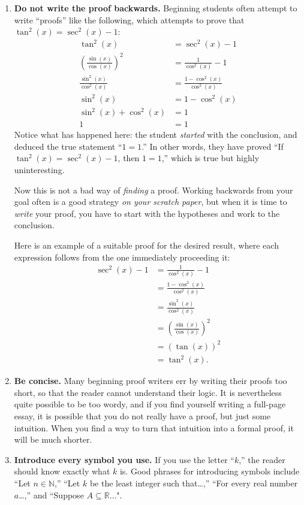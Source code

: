 \begin{enumerate}
\item \textbf{Do not write the proof backwards.}
Beginning students often attempt to write ``proofs'' like the following, which attempts to prove that $\tan^2(x)  = \sec^2(x) - 1$:
\begin{align*}
\tan^2(x) & = \sec^2(x) - 1 \\
\left(\frac{\sin(x)}{\cos(x)}\right)^2 & = \frac{1}{\cos^2(x)} - 1 \\
\frac{\sin^2(x)}{\cos^2(x)} & =  \frac{1-\cos^2(x)}{\cos^2(x)} \\
\sin^2(x) & = 1-\cos^2(x) \\
\sin^2(x) + \cos^2(x) & = 1 \\
1 & = 1
\end{align*}        
Notice what has happened here:  the student \emph{started} with the conclusion, and deduced the true statement ``$1=1$.'' In other words, they have proved ``If $\tan^2(x) = \sec^2(x) - 1$, then $1=1$,'' which is true but highly uninteresting.
        
Now this is not a bad way of \emph{finding} a proof. Working backwards from your goal often is a good strategy \emph{on your scratch paper}, but when it is time to \emph{write} your proof, you have to start with the hypotheses and work to the conclusion.

Here is an example of a suitable proof for the desired result, where each expression follows from the one immediately proceeding it:
\begin{align*}
\sec^2(x) - 1 & = \frac{1}{\cos^2(x)} - 1\\
& = \frac{1-\cos^2(x)}{\cos^2(x)} \\
& = \frac{\sin^2(x)}{\cos^2(x)} \\
& = \left(\frac{\sin(x)}{\cos(x)}\right)^2 \\
& = \left(\tan(x)\right)^2 \\
& = \tan^2(x).
\end{align*}

\item \textbf{Be concise.}
Many beginning proof writers err by writing their proofs too short, so that the reader cannot understand their logic. It is nevertheless quite possible to be too wordy, and if you find yourself writing a full-page essay, it is possible that you do not really have a proof, but just some intuition. When you find a way to turn that intuition into a formal proof, it will be much shorter.

\item \textbf{Introduce every symbol you use.}
If you use the letter ``$k$,'' the reader should know exactly what $k$ is. Good phrases for introducing symbols include ``Let $n\in \mathbb{N}$,'' ``Let $k$ be the least integer such that\ldots,'' ``For every real number $a$\ldots,'' and ``Suppose $A\subseteq\mathbb{R}\ldots$".
          

\end{enumerate}

